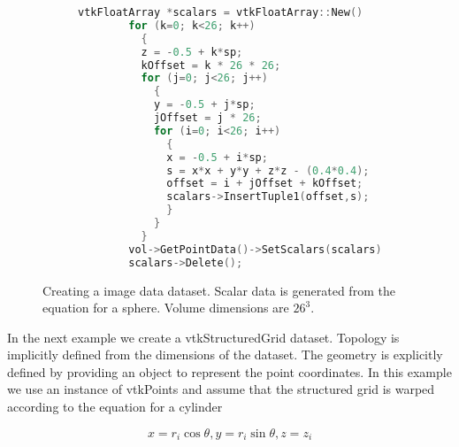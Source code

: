 \begin{description}[leftmargin=0cm,labelindent=0cm]
\begin{figure}[!htb]
\begin{subfigure}[h]{0.56\linewidth}
\begin{lstlisting}[language=C++, caption={}]
		vtkFloatArray *scalars = vtkFloatArray::New()
		for (k=0; k<26; k++)
		  {
		  z = -0.5 + k*sp;
		  kOffset = k * 26 * 26;
		  for (j=0; j<26; j++)
		    {
		    y = -0.5 + j*sp;
		    jOffset = j * 26;
		    for (i=0; i<26; i++)
		      {
		      x = -0.5 + i*sp;
		      s = x*x + y*y + z*z - (0.4*0.4);
		      offset = i + jOffset + kOffset;
		      scalars->InsertTuple1(offset,s);
		      }
		    }
		  }
		vol->GetPointData()->SetScalars(scalars);
		scalars->Delete();
		\end{lstlisting}
		\caption*{}
		\label{fig:Figure5-18c}
	\end{subfigure}
	\caption{Creating a image data dataset. Scalar data is generated from the equation for a sphere. Volume dimensions are $26^3$.}\label{fig:Figure5-18}
\end{figure}

\item[Create a Structured Grid Dataset.]

In the next example we create a vtkStructuredGrid dataset. Topology is implicitly defined from the dimensions of the dataset. The geometry is explicitly defined by providing an object to represent the point coordinates. In this example we use an instance of vtkPoints and assume that the structured grid is warped according to the equation for a cylinder

\begin{equation}\label{eq:5.3}
x = r_i \cos\theta, y = r_i \sin\theta, z = z_i
\end{equation}


\end{description}
